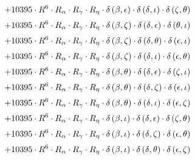 \begin{subequations}
\begin{gather}
 \\[0.2em] \notag 		 + 10395 \cdot R^{6} \cdot R_{\alpha{}} \cdot R_{\gamma{}} \cdot R_{\eta{}} \cdot \delta{}\left(\beta{}, \epsilon{}\right) \cdot \delta{}\left(\delta{}, \iota{}\right) \cdot \delta{}\left(\zeta{}, \theta{}\right) 
 \\[0.2em] \notag 		 + 10395 \cdot R^{6} \cdot R_{\alpha{}} \cdot R_{\gamma{}} \cdot R_{\eta{}} \cdot \delta{}\left(\beta{}, \zeta{}\right) \cdot \delta{}\left(\delta{}, \epsilon{}\right) \cdot \delta{}\left(\theta{}, \iota{}\right) 
 \\[0.2em] \notag 		 + 10395 \cdot R^{6} \cdot R_{\alpha{}} \cdot R_{\gamma{}} \cdot R_{\eta{}} \cdot \delta{}\left(\beta{}, \zeta{}\right) \cdot \delta{}\left(\delta{}, \theta{}\right) \cdot \delta{}\left(\epsilon{}, \iota{}\right) 
 \\[0.2em] \notag 		 + 10395 \cdot R^{6} \cdot R_{\alpha{}} \cdot R_{\gamma{}} \cdot R_{\eta{}} \cdot \delta{}\left(\beta{}, \zeta{}\right) \cdot \delta{}\left(\delta{}, \iota{}\right) \cdot \delta{}\left(\epsilon{}, \theta{}\right) 
 \\[0.2em] \notag 		 + 10395 \cdot R^{6} \cdot R_{\alpha{}} \cdot R_{\gamma{}} \cdot R_{\eta{}} \cdot \delta{}\left(\beta{}, \theta{}\right) \cdot \delta{}\left(\delta{}, \epsilon{}\right) \cdot \delta{}\left(\zeta{}, \iota{}\right) 
 \\[0.2em] \notag 		 + 10395 \cdot R^{6} \cdot R_{\alpha{}} \cdot R_{\gamma{}} \cdot R_{\eta{}} \cdot \delta{}\left(\beta{}, \theta{}\right) \cdot \delta{}\left(\delta{}, \zeta{}\right) \cdot \delta{}\left(\epsilon{}, \iota{}\right) 
 \\[0.2em] \notag 		 + 10395 \cdot R^{6} \cdot R_{\alpha{}} \cdot R_{\gamma{}} \cdot R_{\eta{}} \cdot \delta{}\left(\beta{}, \theta{}\right) \cdot \delta{}\left(\delta{}, \iota{}\right) \cdot \delta{}\left(\epsilon{}, \zeta{}\right) 
 \\[0.2em] \notag 		 + 10395 \cdot R^{6} \cdot R_{\alpha{}} \cdot R_{\gamma{}} \cdot R_{\eta{}} \cdot \delta{}\left(\beta{}, \iota{}\right) \cdot \delta{}\left(\delta{}, \epsilon{}\right) \cdot \delta{}\left(\zeta{}, \theta{}\right) 
 \\[0.2em] \notag 		 + 10395 \cdot R^{6} \cdot R_{\alpha{}} \cdot R_{\gamma{}} \cdot R_{\eta{}} \cdot \delta{}\left(\beta{}, \iota{}\right) \cdot \delta{}\left(\delta{}, \zeta{}\right) \cdot \delta{}\left(\epsilon{}, \theta{}\right) 
 \\[0.2em] \notag 		 + 10395 \cdot R^{6} \cdot R_{\alpha{}} \cdot R_{\gamma{}} \cdot R_{\eta{}} \cdot \delta{}\left(\beta{}, \iota{}\right) \cdot \delta{}\left(\delta{}, \theta{}\right) \cdot \delta{}\left(\epsilon{}, \zeta{}\right) 

\end{gather}
\end{subequations}
